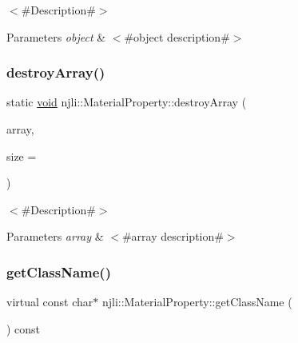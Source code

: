 $<$\#\+Description\#$>$


\begin{DoxyParams}{Parameters}
{\em object} & $<$\#object description\#$>$ \\
\hline
\end{DoxyParams}
\mbox{\label{classnjli_1_1_material_property_a663827a5878ba71adb46ace8142f823d}} 
\subsubsection{\texorpdfstring{destroy\+Array()}{destroyArray()}}
{\footnotesize\ttfamily static \mbox{\hyperlink{_thread_8h_af1e856da2e658414cb2456cb6f7ebc66}{void}} njli\+::\+Material\+Property\+::destroy\+Array (\begin{DoxyParamCaption}\item[{\mbox{\hyperlink{classnjli_1_1_material_property}{Material\+Property}} $\ast$$\ast$}]{array,  }\item[{const \mbox{\hyperlink{_util_8h_a10e94b422ef0c20dcdec20d31a1f5049}{u32}}}]{size = {} }\end{DoxyParamCaption})\hspace{0.3cm}{\ttfamily [static]}}

$<$\#\+Description\#$>$


\begin{DoxyParams}{Parameters}
{\em array} & $<$\#array description\#$>$ \\
\hline
\end{DoxyParams}
\mbox{\label{classnjli_1_1_material_property_a10e4f8c062f12361638445530f82bd69}} 
\subsubsection{\texorpdfstring{get\+Class\+Name()}{getClassName()}}
{\footnotesize\ttfamily virtual const char$\ast$ njli\+::\+Material\+Property\+::get\+Class\+Name (\begin{DoxyParamCaption}{ }\end{DoxyParamCaption}) const\hspace{0.3cm}{\ttfamily [virtual]}}

